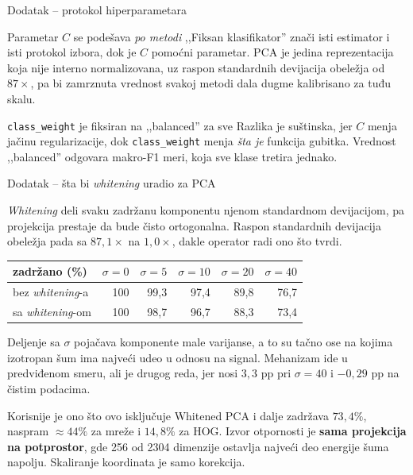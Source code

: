 \documentclass[aspectratio=169, 10pt]{beamer}
\newcommand{\uska}{\setlength{\tabcolsep}{4pt}\small}
\begin{document}
\begin{frame}{Dodatak -- protokol hiperparametara}

\begin{block}{Parametar $C$ se podešava \emph{po metodi}}
,,Fiksan klasifikator'' znači isti estimator i isti protokol izbora, dok je $C$ pomoćni
parametar. PCA je jedina reprezentacija koja nije interno normalizovana, uz raspon standardnih
devijacija obeležja od $87\times$, pa bi zamrznuta vrednost svakoj metodi dala dugme
kalibrisano za tuđu skalu.
\end{block}

\begin{block}{\texttt{class\_weight} je fiksiran na ,,balanced'' za sve}
Razlika je suštinska, jer $C$ menja jačinu regularizacije, dok \texttt{class\_weight} menja
\emph{šta je} funkcija gubitka. Vrednost ,,balanced'' odgovara makro-F1 meri, koja sve klase
tretira jednako.
\end{block}

\end{frame}

\begin{frame}{Dodatak -- šta bi \textit{whitening} uradio za PCA}

\small
\textit{Whitening} deli svaku zadržanu komponentu njenom standardnom devijacijom, pa projekcija
prestaje da bude čisto ortogonalna. Raspon standardnih devijacija obeležja pada sa
$87{,}1\times$ na $1{,}0\times$, dakle operator radi ono što tvrdi.

\begin{center}
\uska
\begin{tabular}{lrrrrr}
\toprule
\textbf{zadržano (\%)} & $\sigma=0$ & $\sigma=5$ & $\sigma=10$ & $\sigma=20$ & $\sigma=40$ \\
\midrule
bez \textit{whitening}-a & 100 & 99,3 & 97,4 & 89,8 & \alert{76,7} \\
sa \textit{whitening}-om & 100 & 98,7 & 96,7 & 88,3 & \alert{73,4} \\
\bottomrule
\end{tabular}
\end{center}

\vspace{0.1cm}
\footnotesize
Deljenje sa $\sigma$ pojačava komponente male varijanse, a to su tačno ose na kojima izotropan
šum ima najveći udeo u odnosu na signal. Mehanizam ide u predviđenom smeru, ali je
\alert{drugog reda}, jer nosi $3{,}3$ pp pri $\sigma=40$ i $-0{,}29$ pp na čistim podacima.

\begin{alertblock}{Korisnije je ono što ovo isključuje}
Whitened PCA i dalje zadržava $73{,}4\%$, naspram $\approx 44\%$ za mreže i $14{,}8\%$ za HOG.
Izvor otpornosti je \textbf{sama projekcija na potprostor}, gde 256 od 2304 dimenzije ostavlja
najveći deo energije šuma napolju. Skaliranje koordinata je samo korekcija.
\end{alertblock}

\end{frame}
\end{document}
